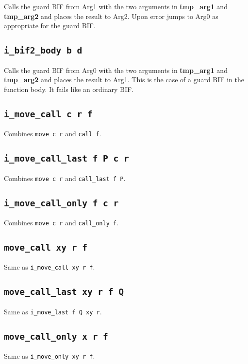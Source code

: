 \documentclass{article}
\newcommand{\tmpa}{\textbf{tmp\_arg1}}
\newcommand{\tmpb}{\textbf{tmp\_arg2}}
\newcommand{\iop}[1]{\texttt{#1}}
\begin{document}
Calls the guard BIF from Arg1 with the two arguments in \tmpa{} and \tmpb{} and
places the result to Arg2. Upon error jumps to Arg0 as appropriate for the guard
BIF.

\subsection*{\iop{i\_bif2\_body b d}}

Calls the guard BIF from Arg0 with the two arguments in \tmpa{} and \tmpb{} and
places the result to Arg1. This is the case of a guard BIF in the function body.
It fails like an ordinary BIF.

\subsection*{\iop{i\_move\_call c r f}}

Combines \iop{move c r} and \iop{call f}.

\subsection*{\iop{i\_move\_call\_last f P c r}}

Combines \iop{move c r} and \iop{call\_last f P}.

\subsection*{\iop{i\_move\_call\_only f c r}}

Combines \iop{move c r} and \iop{call\_only f}.

\subsection*{\iop{move\_call xy r f}}

Same as \iop{i\_move\_call xy r f}.

\subsection*{\iop{move\_call\_last xy r f Q}}

Same as \iop{i\_move\_last f Q xy r}.

\subsection*{\iop{move\_call\_only x r f}}

Same as \iop{i\_move\_only xy r f}.
\end{document}
